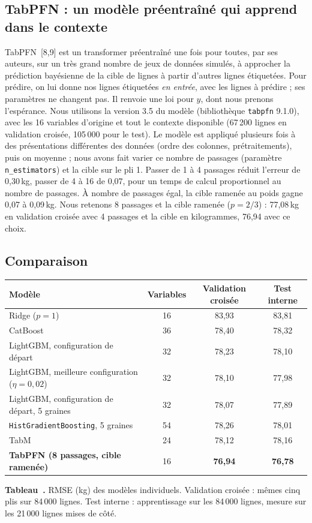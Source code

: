 \documentclass[11pt,a4paper]{article}
\newcommand{\code}[1]{\texttt{\small #1}}
\newcommand{\kg}{\,kg}
\newcounter{fig}
\newenvironment{tableau}{\par\smallskip\noindent\begin{minipage}{\linewidth}\centering}{\end{minipage}\par\smallskip}
\newcounter{tab}
\newcommand{\legende}[2]{\refstepcounter{tab}\label{#1}{\small\textbf{Tableau~\thetab.} #2\par}}
\begin{document}
\subsection{TabPFN : un modèle préentraîné qui apprend dans le contexte}
TabPFN~[8,9] est un transformer préentraîné une fois pour toutes, par ses auteurs, sur un très grand nombre de
jeux de données simulés, à approcher la prédiction bayésienne de la cible de lignes à partir d'autres lignes
étiquetées. Pour prédire, on lui donne nos lignes étiquetées \emph{en entrée}, avec les lignes à prédire ; ses
paramètres ne changent pas. Il renvoie une loi pour $y$, dont nous prenons l'espérance. Nous utilisons la version 3.5 du modèle (bibliothèque \code{tabpfn} 9.1.0), avec les 16 variables
d'origine et tout le contexte disponible (67\,200 lignes en validation croisée, 105\,000 pour le test).
Le modèle est appliqué plusieurs fois à des présentations différentes des données (ordre des colonnes,
prétraitements), puis on moyenne ; nous avons fait varier ce nombre de passages (paramètre \code{n\_estimators}) et la cible sur le pli 1.
Passer de 1 à 4 passages réduit l'erreur de 0,30\kg, passer de 4 à 16 de 0,07, pour un temps de calcul
proportionnel au nombre de passages. À nombre de passages égal, la cible ramenée au poids gagne 0,07 à
0,09\kg. Nous retenons 8 passages et la cible ramenée ($p = 2/3$) : 77,08\kg{} en validation croisée avec
4 passages et la cible en kilogrammes, 76,94 avec ce choix.

\subsection{Comparaison}
\begin{tableau}\small
\begin{tabular}{@{}lccc@{}}
\toprule
Modèle & Variables & Validation croisée & Test interne \\
\midrule
Ridge ($p = 1$) & 16 & 83,93 & 83,81 \\
CatBoost & 36 & 78,40 & 78,32 \\
LightGBM, configuration de départ & 32 & 78,23 & 78,10 \\
LightGBM, meilleure configuration ($\eta = 0{,}02$) & 32 & 78,10 & 77,98 \\
LightGBM, configuration de départ, 5 graines & 32 & 78,07 & 77,89 \\
\code{HistGradientBoosting}, 5 graines & 54 & 78,26 & 78,01 \\
TabM & 24 & 78,12 & 78,16 \\
\textbf{TabPFN (8 passages, cible ramenée)} & 16 & \textbf{76,94} & \textbf{76,78} \\
\bottomrule
\end{tabular}\par\vspace{2pt}
\legende{tab:individuels}{RMSE (kg) des modèles individuels. Validation croisée : mêmes cinq plis sur
84\,000 lignes. Test interne : apprentissage sur les 84\,000 lignes, mesure sur les 21\,000 lignes mises de côté.}
\end{tableau}
\end{document}
